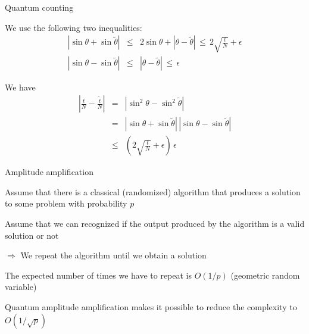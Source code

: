 
\begin{frame}{Quantum counting}

We use the following two inequalities:
\begin{eqnarray*}
|\sin\theta + \sin\tilde{\theta}| & \le & 2 \sin\theta + |\theta - \tilde{\theta} |  \, \le \, 2\sqrt{\frac{t}{N}} + \epsilon\\
|\sin\theta - \sin\tilde{\theta}| & \le & |\theta - \tilde{\theta}|  \, \le \, \epsilon
\end{eqnarray*}

\bigskip
We have
\begin{eqnarray*}
\left| \frac{t}{N} - \frac{\tilde{t}}{N} \right| 
& = &
|\sin^2 \theta - \sin^2\tilde{\theta}| \\
& = &
|\sin\theta + \sin\tilde{\theta}| \, |\sin\theta - \sin\tilde{\theta}| \\
& \le &
\left(
2 \sqrt{\frac{t}{N}} + \epsilon
\right) \, \epsilon
\end{eqnarray*}

\end{frame}


\begin{frame}{Amplitude amplification}

Assume that there is a classical (randomized) algorithm that produces a solution to some problem with probability $p$

\bigskip
Assume that we can recognized if the output produced by the algorithm is a valid solution or not

\bigskip
$\Rightarrow$ We repeat the algorithm until we obtain a solution

\bigskip
The expected number of times we have to repeat is $O(1/p)$ (geometric random variable)

\bigskip
Quantum amplitude amplification makes it possible to reduce the complexity to $O(1/\sqrt{p})$

\end{frame}

